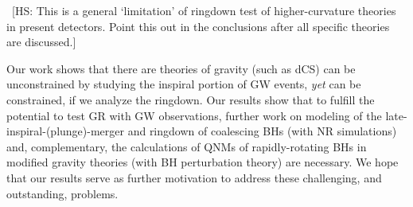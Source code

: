 \documentclass[twocolumn,
               prd,
               aps,
               superscriptaddress,
               tightenlines,
               nofootinbib,
               eqsecnum,
               amsfonts,
               amsmath,
               longbibliography]{revtex4-1}
\newcommand{\agcomm}[1]{{\textcolor{red}{{[AG: #1]}}}}
\newcommand{\hs}[1]{{\textcolor{TealBlue}{{#1}}}}
\newcommand{\hscomm}[1]{{\textcolor{TealBlue}{{[HS: #1]}}}}
\begin{document}



~\hscomm{This is a general `limitation' of ringdown test of higher-curvature theories in present detectors.
Point this out in the conclusions after all specific theories are discussed.}



Our work shows that there are theories of gravity (such as dCS) can be unconstrained by studying the
inspiral portion of GW events, {\it yet} can be constrained, if we analyze the ringdown.
%
Our results show that to fulfill the potential to test GR with GW observations,
further work on modeling of the late-inspiral-(plunge)-merger and ringdown of
coalescing BHs  (with NR simulations) and, complementary, the calculations of
QNMs of rapidly-rotating BHs in modified gravity theories (with BH perturbation
theory) are necessary.
%
We hope that our results serve as further motivation to address these
challenging, and outstanding, problems.

%
\end{document}
